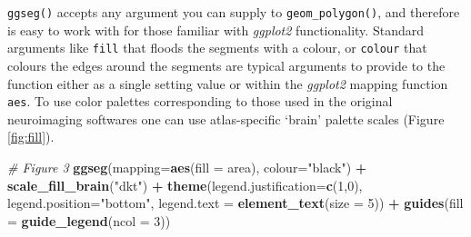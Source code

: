 \documentclass[fleqn,10pt]{wlpeerj} %
\newenvironment{Shaded}{\begin{snugshade}}{\end{snugshade}}
\newcommand{\CommentTok}[1]{\textcolor[rgb]{0.56,0.35,0.01}{\textit{#1}}}
\newcommand{\DataTypeTok}[1]{\textcolor[rgb]{0.13,0.29,0.53}{#1}}
\newcommand{\DecValTok}[1]{\textcolor[rgb]{0.00,0.00,0.81}{#1}}
\newcommand{\KeywordTok}[1]{\textcolor[rgb]{0.13,0.29,0.53}{\textbf{#1}}}
\newcommand{\NormalTok}[1]{#1}
\newcommand{\OperatorTok}[1]{\textcolor[rgb]{0.81,0.36,0.00}{\textbf{#1}}}
\newcommand{\StringTok}[1]{\textcolor[rgb]{0.31,0.60,0.02}{#1}}
\begin{document}
\texttt{ggseg()} accepts any argument you can supply to \texttt{geom\_polygon()}, and therefore is easy to work with for those familiar with \emph{ggplot2} functionality.
Standard arguments like \texttt{fill} that floods the segments with a colour, or \texttt{colour} that colours the edges around the segments are typical arguments to provide to the function either as a single setting value or within the \emph{ggplot2} mapping function \texttt{aes}.
To use color palettes corresponding to those used in the original neuroimaging softwares one can use atlas-specific `brain' palette scales (Figure \ref{fig:fill}).

\begin{Shaded}
\begin{Highlighting}[]
\CommentTok{\# Figure 3}
\KeywordTok{ggseg}\NormalTok{(}\DataTypeTok{mapping=}\KeywordTok{aes}\NormalTok{(}\DataTypeTok{fill =}\NormalTok{ area), }\DataTypeTok{colour=}\StringTok{"black"}\NormalTok{) }\OperatorTok{+}
\StringTok{  }\KeywordTok{scale\_fill\_brain}\NormalTok{(}\StringTok{"dkt"}\NormalTok{) }\OperatorTok{+}
\StringTok{  }\KeywordTok{theme}\NormalTok{(}\DataTypeTok{legend.justification=}\KeywordTok{c}\NormalTok{(}\DecValTok{1}\NormalTok{,}\DecValTok{0}\NormalTok{),}
        \DataTypeTok{legend.position=}\StringTok{"bottom"}\NormalTok{,}
        \DataTypeTok{legend.text =} \KeywordTok{element\_text}\NormalTok{(}\DataTypeTok{size =} \DecValTok{5}\NormalTok{)) }\OperatorTok{+}
\StringTok{  }\KeywordTok{guides}\NormalTok{(}\DataTypeTok{fill =} \KeywordTok{guide\_legend}\NormalTok{(}\DataTypeTok{ncol =} \DecValTok{3}\NormalTok{))}
\end{Highlighting}
\end{Shaded}
\end{document}
